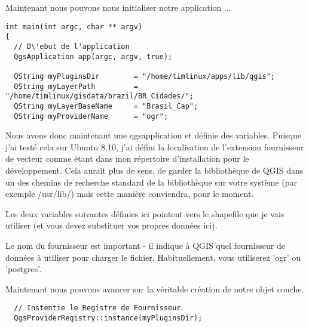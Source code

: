 Maintenant nous pouvons nous initialiser notre application ...

\begin{verbatim}
int main(int argc, char ** argv)
{
  // D\'ebut de l'application
  QgsApplication app(argc, argv, true);

  QString myPluginsDir        = "/home/timlinux/apps/lib/qgis";
  QString myLayerPath         = "/home/timlinux/gisdata/brazil/BR_Cidades/";
  QString myLayerBaseName     = "Brasil_Cap";
  QString myProviderName      = "ogr";

\end{verbatim}

Nous avons donc maintenant une qgsapplication et d\'efinie des variables. Puisque 
j'ai test\'e cela sur Ubuntu 8.10, j'ai d\'efini la localisation de l'extension 
fournisseur de vecteur comme \'etant dans mon r\'epertoire d'installation pour le 
d\'eveloppement. Cela aurait plus de sens, de garder la biblioth\`eque de QGIS dans 
un des chemins de recherche standard de la biblioth\`eque sur votre syst\`eme (par 
exemple /usr/lib/) mais cette mani\`ere conviendra, pour le moment.

Les deux variables suivantes d\'efinies ici pointent vers le shapefile que je vais 
utiliser (et vous devez substituer vos propres donn\'ees ici).

Le nom du fournisseur est important - il indique \`a QGIS quel fournisseur de 
donn\'ees \`a utiliser pour charger le fichier. Habituellement, vous utiliserez
 'ogr' ou 'postgres'.

Maintenant nous pouvons avancer sur la v\'eritable cr\'eation de notre objet couche.

\begin{verbatim}
  // Instentie le Registre de Fournisseur
  QgsProviderRegistry::instance(myPluginsDir);
\end{verbatim}

